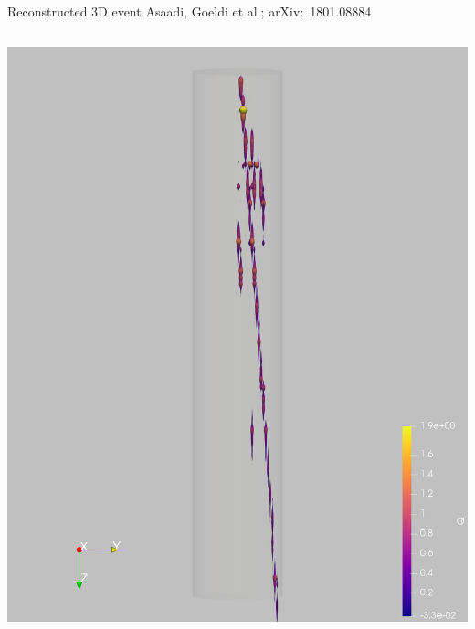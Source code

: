 \documentclass[]{beamer}
\begin{document}
\begin{frame}{Reconstructed 3D event}{}
	{\tiny Asaadi, Goeldi et al.; arXiv:~1801.08884~\cite{pixel_paper}}\\
	\begin{columns}[c]
		\centering
		\includegraphics[width=\textwidth]{viper/event967_pulses_q}
		\centering

\end{columns}
\end{frame}
\end{document}
